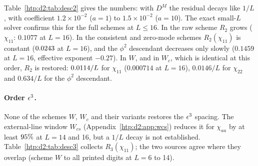 Table~\ref{htp:d2:tab:desc2} gives the numbers: with $D^M$ the residual decays like $1/L$, with coefficient $1.2\times10^{-2}$
($a=1$) to $1.5\times10^{-2}$ ($a=10$). The exact small-$L$ solver confirms this for the full schemes at $L\le16$. In the raw
scheme $R_2$ grows ($\chi_{11}$: $0.1077$ at $L=16$). In the consistent and zero-mode schemes $R_2(\chi_{11})$ is constant
($0.0243$ at $L=16$), and the $\phi^2$ descendant decreases only slowly ($0.1459$ at $L=16$, effective exponent
$-0.27$). In $W$, and in $W_c$, which is identical at this order, $R_2$ is restored: $0.0114/L$ for $\chi_{11}$
($0.000714$ at $L=16$), $0.0146/L$ for $\chi_{22}$ and $0.634/L$ for the $\phi^2$ descendant.

\paragraph{Order $\epsilon^3$.}\label{htp:d2:app:desc3} None of the schemes $W$, $W_c$ and their variants restores the $\epsilon^3$
spacing. The external-line window $W_{cs}$ (Appendix~\ref{htp:d2:app:wcs}) reduces it for $\chi_{aa}$ by at least
$95\%$ at $L=14$ and 16, but a $1/L$ decay is not established.
Table~\ref{htp:d2:tab:desc3} collects $R_3(\chi_{11})$; the two sources agree where they overlap (scheme $W$ to all printed digits
at $L=6$ to 14).

